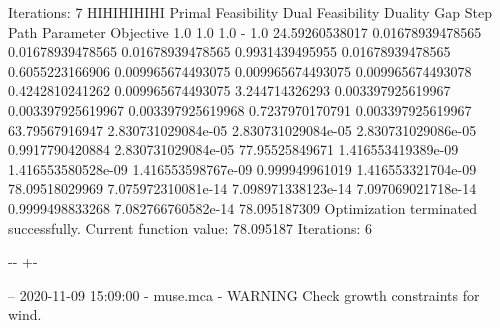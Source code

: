 \documentclass[letterpaper,10pt,english]{sphinxmanual}
\newlength\nbsphinxcodecellspacing
\begin{document}
{\begin{sphinxVerbatim}[commandchars=\\\{\}]
         Iterations: 7
HIHIHIHIHI
Primal Feasibility  Dual Feasibility    Duality Gap         Step             Path Parameter      Objective
1.0                 1.0                 1.0                 -                1.0                 24.59260538017
0.01678939478565    0.01678939478565    0.01678939478565    0.9931439495955  0.01678939478565    0.6055223166906
0.009965674493075   0.009965674493075   0.009965674493078   0.4242810241262  0.009965674493075   3.244714326293
0.003397925619967   0.003397925619967   0.003397925619968   0.7237970170791  0.003397925619967   63.79567916947
2.830731029084e-05  2.830731029084e-05  2.830731029086e-05  0.9917790420884  2.830731029084e-05  77.95525849671
1.416553419389e-09  1.416553580528e-09  1.416553598767e-09  0.999949961019   1.416553321704e-09  78.09518029969
7.075972310081e-14  7.098971338123e-14  7.097069021718e-14  0.9999498833268  7.082766760582e-14  78.095187309
Optimization terminated successfully.
         Current function value: 78.095187
         Iterations: 6
\end{sphinxVerbatim}
}

{

\kern-\sphinxverbatimsmallskipamount\kern-\baselineskip
\kern+\FrameHeightAdjust\kern-\fboxrule
\vspace{\nbsphinxcodecellspacing}

\begin{sphinxVerbatim}[commandchars=\\\{\}]
-- 2020-11-09 15:09:00 - muse.mca - WARNING
Check growth constraints for wind.

\end{sphinxVerbatim}
}
\end{document}
